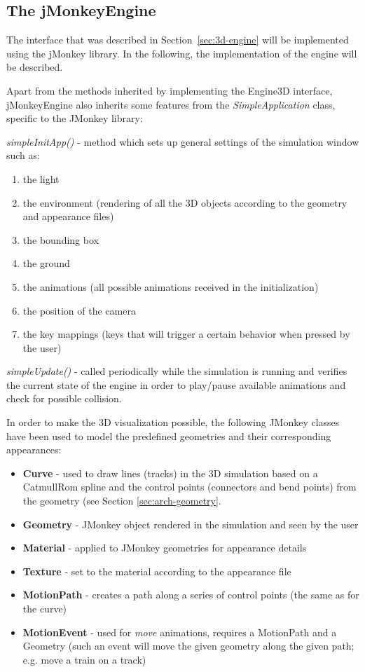\subsection{The jMonkeyEngine}

The interface that was described in Section~\ref{sec:3d-engine} will be implemented using the jMonkey library. In the following, the implementation of the engine will be described.

Apart from the methods inherited by implementing the Engine3D interface, jMonkeyEngine also inherits some features from the \textit{SimpleApplication} class, specific to the JMonkey library:

\textit{simpleInitApp()} - method which sets up general settings of the simulation window such as: 
\begin{enumerate}
\item the light
\item the environment (rendering of all the 3D objects according to the geometry and appearance files)
\item the bounding box
\item the ground
\item the animations (all possible animations received in the initialization)
\item the position of the camera
\item the key mappings (keys that will trigger a certain behavior when pressed by the user)   
\end{enumerate}  

 
\textit{simpleUpdate()} - called periodically while the simulation is running and verifies the current state of the engine in order to play/pause available animations and check for possible collision.

 
In order to make the 3D visualization possible, the following JMonkey classes have been used to model the predefined geometries and their corresponding appearances: 
\begin{itemize}
\item \textbf{Curve} - used to draw lines (tracks) in the 3D simulation based on a CatmullRom spline and the control points (connectors and bend points) from the geometry (see Section \ref{sec:arch-geometry}. 
\item \textbf{Geometry} - JMonkey object rendered in the simulation and seen by the user
\item \textbf{Material} - applied to JMonkey geometries for appearance details
\item \textbf{Texture} - set to the material according to the appearance file
\item \textbf{MotionPath} - creates a path along a series of control points (the same as for the curve)
\item \textbf{MotionEvent} - used for \textit{move} animations, requires a MotionPath and a Geometry (such an event will move the given geometry along the given path; e.g. move a train on a track)
\end{itemize}

